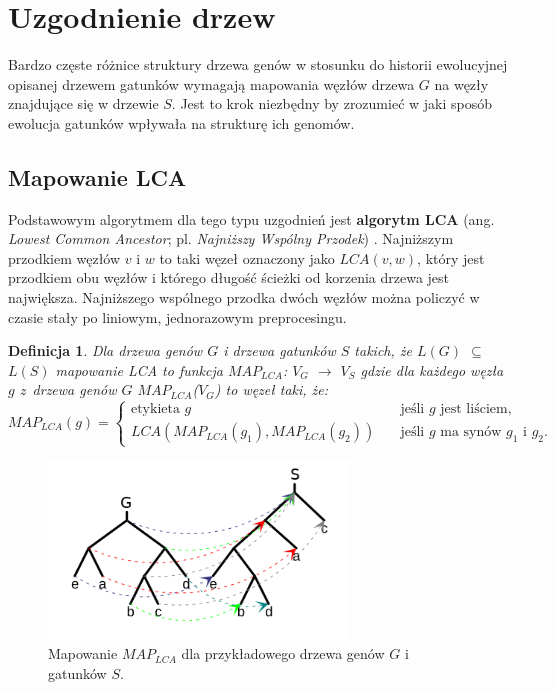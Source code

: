 \documentclass[licencjacka]{pracamgr}
\newtheorem{defi}{Definicja}[section]
\begin{document}
\section{Uzgodnienie drzew}
Bardzo częste różnice struktury drzewa genów w stosunku do historii ewolucyjnej opisanej drzewem gatunków wymagają mapowania węzłów drzewa $G$ na węzły znajdujące się w drzewie $S$. Jest to krok niezbędny by zrozumieć w jaki sposób ewolucja gatunków wpływała na strukturę ich genomów. 

\subsection{Mapowanie LCA}
Podstawowym algorytmem dla tego typu uzgodnień jest \textbf{algorytm LCA} (ang. \textit{Lowest Common Ancestor}; pl. \textit{Najniższy Wspólny Przodek}) \cite{PAGE:1994jv}. Najniższym przodkiem węzłów $v$ i $w$ to taki węzeł oznaczony jako $LCA(v,w)$, który jest przodkiem obu węzłów i którego długość ścieżki od korzenia drzewa jest największa. Najniższego wspólnego przodka dwóch węzłów można policzyć w czasie stały po liniowym, jednorazowym preprocesingu. 

\begin{defi}
Dla drzewa genów $G$ i drzewa gatunków $S$ takich, że $L(G)$ $\subseteq$ $L(S)$ mapowanie LCA to funkcja $MAP_{LCA}$: $V_G$ $\rightarrow$ $V_S$ gdzie dla każdego węzła $g$ z~drzewa genów $G$ $MAP_{LCA}$($V_G$) to węzeł taki, że:
\[ MAP_{LCA}(g) =
  \begin{cases}
    \text{etykieta }g       & \quad \text{jeśli } g \text{ jest liściem,}\\
    LCA(MAP_{LCA}(g_1),MAP_{LCA}(g_2))  & \quad \text{jeśli } g \text{ ma synów } g_1 \text{ i } g_2.
  \end{cases}
\]
\end{defi}

\begin{figure}[H]
  \centering
  \includegraphics[width=80mm]{./pictures/mapping.png}
  \caption{Mapowanie $MAP_{LCA}$ dla przykładowego drzewa genów $G$ i gatunków $S$.}
\end{figure}
\end{document}

